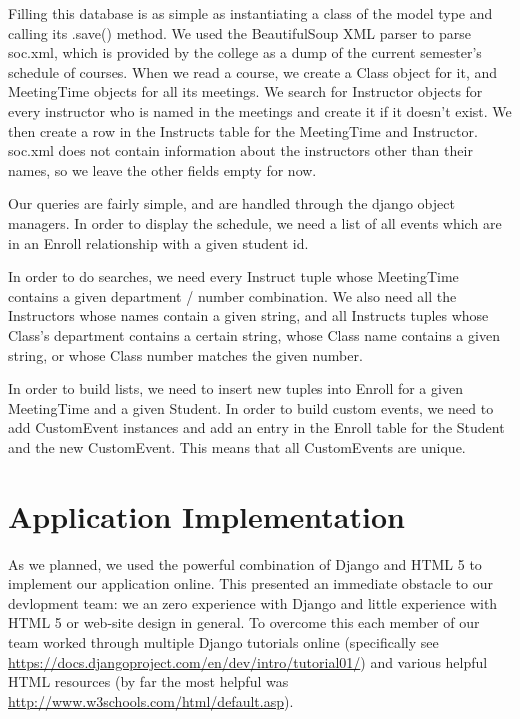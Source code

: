 \documentclass[pdftex,12pt,letter]{article}
\begin{document}
Filling this database is as simple as instantiating a class of the model type and calling its .save() method.  We used the BeautifulSoup XML parser to parse soc.xml, which is provided by the college as a dump of the current semester's schedule of courses.  When we read a course, we create a Class object for it, and MeetingTime objects for all its meetings.  We search for Instructor objects for every instructor who is named in the meetings and create it if it doesn't exist.  We then create a row in the Instructs table for the MeetingTime and Instructor.  soc.xml does not contain information about the instructors other than their names, so we leave the other fields empty for now.

Our queries are fairly simple, and are handled through the django object managers.  In order to display the schedule, we need a list of all events which are in an Enroll relationship with a given student id.

In order to do searches, we need every Instruct tuple whose MeetingTime contains a given department / number combination.  We also need all the Instructors whose names contain a given string, and all Instructs tuples whose Class's department contains a certain string, whose Class name contains a given string, or whose Class number matches the given number.

In order to build lists, we need to insert new tuples into Enroll for a given MeetingTime and a given Student.  In order to build custom events, we need to add CustomEvent instances and add an entry in the Enroll table for the Student and the new CustomEvent.  This means that all CustomEvents are unique.

\section{Application Implementation}
As we planned, we used the powerful combination of Django and HTML 5 to implement our application online. This presented an immediate obstacle to our devlopment team: we an zero experience with Django and little experience with HTML 5 or web-site design in general. To overcome this each member of our team worked through multiple Django tutorials online (specifically see \url{https://docs.djangoproject.com/en/dev/intro/tutorial01/}) and various helpful HTML resources (by far the most helpful was \url{http://www.w3schools.com/html/default.asp}).\\
\end{document}
